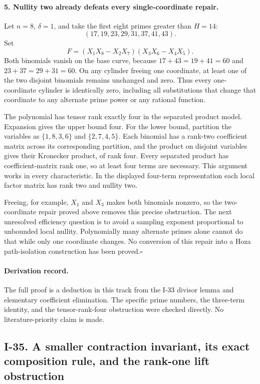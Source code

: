 \paragraph{5. Nullity two already defeats every single-coordinate repair.}
Let $n=8$, $\delta=1$, and take the first eight primes
greater than $H=14$:
\[
 (17,19,23,29,31,37,41,43).
\]
Set
\[
 F=(X_1X_8-X_2X_7)(X_3X_6-X_4X_5).
\]
Both binomials vanish on the base curve, because
$17+43=19+41=60$ and $23+37=29+31=60$.
On any cylinder freeing one coordinate, at least one of
the two disjoint binomials remains unchanged and zero.
Thus every one-coordinate cylinder is identically zero,
including all substitutions that change that coordinate
to any alternate prime power or any rational function.

The polynomial has tensor rank exactly four in the separated
product model. Expansion gives the upper bound four. For
the lower bound, partition the variables as
$\{1,8,3,6\}$ and $\{2,7,4,5\}$.
Each binomial has a rank-two coefficient matrix across its
corresponding partition, and the product on disjoint
variables gives their Kronecker product, of rank four.
Every separated product has coefficient-matrix rank one,
so at least four terms are necessary. This argument works
in every characteristic. In the displayed four-term
representation each local factor matrix has rank two and
nullity two.

Freeing, for example, $X_1$ and $X_3$ makes both binomials
nonzero, so the two-coordinate repair proved above removes
this precise obstruction. The next unresolved efficiency
question is to avoid a sampling exponent proportional to
unbounded local nullity. Polynomially many alternate primes
alone cannot do that while only one coordinate changes.
No conversion of this repair into a Hoza path-isolation
construction has been proved.\hfill$\square$

\paragraph{Derivation record.}
The full proof is a deduction in this track from the I-33
divisor lemma and elementary coefficient elimination.
The specific prime numbers, the three-term identity, and
the tensor-rank-four obstruction were checked directly.
No literature-priority claim is made.

\subsection{I-35. A smaller contraction invariant, its exact composition rule, and the rank-one lift obstruction}
\label{I-35}

